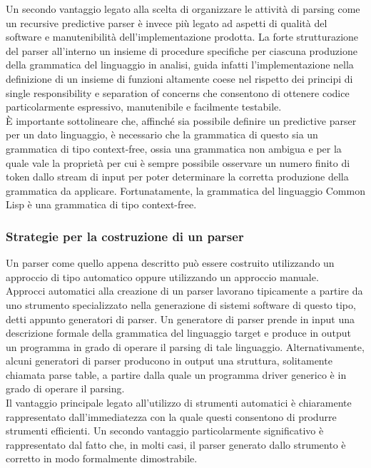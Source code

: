 Un secondo vantaggio legato alla scelta di organizzare le attività di parsing
come un recursive predictive parser è invece più legato ad aspetti di qualità
del software e manutenibilità dell’implementazione prodotta. La forte
strutturazione del parser all'interno un insieme di procedure specifiche per
ciascuna produzione della grammatica del linguaggio in analisi, guida infatti
l’implementazione nella definizione di un insieme di funzioni altamente coese
nel rispetto dei principi di single responsibility e separation of concerns che
consentono di ottenere codice particolarmente espressivo, manutenibile e
facilmente testabile.\\

È importante sottolineare che, affinché sia possibile definire un predictive
parser per un dato linguaggio, è necessario che la grammatica di questo sia un
grammatica di tipo context-free, ossia una grammatica non ambigua e per la quale
vale la proprietà per cui è sempre possibile osservare un numero finito di token
dallo stream di input per poter determinare la corretta produzione della
grammatica da applicare. Fortunatamente, la grammatica del linguaggio Common
Lisp è una grammatica di tipo context-free.

\subsubsection{Strategie per la costruzione di un parser}

Un parser come quello appena descritto può essere costruito utilizzando un
approccio di tipo automatico oppure utilizzando un approccio manuale.\\

Approcci automatici alla creazione di un parser lavorano tipicamente a partire
da uno strumento specializzato nella generazione di sistemi software di questo
tipo, detti appunto generatori di parser. Un generatore di parser prende in
input una descrizione formale della grammatica del linguaggio target e produce
in output un programma in grado di operare il parsing di tale linguaggio.
Alternativamente, alcuni generatori di parser producono in output una struttura,
solitamente chiamata parse table, a partire dalla quale un programma driver
generico è in grado di operare il parsing.\\

Il vantaggio principale legato all'utilizzo di strumenti automatici è
chiaramente rappresentato dall’immediatezza con la quale questi consentono di
produrre strumenti efficienti. Un secondo vantaggio particolarmente
significativo è rappresentato dal fatto che, in molti casi, il parser generato
dallo strumento è corretto in modo formalmente dimostrabile.

